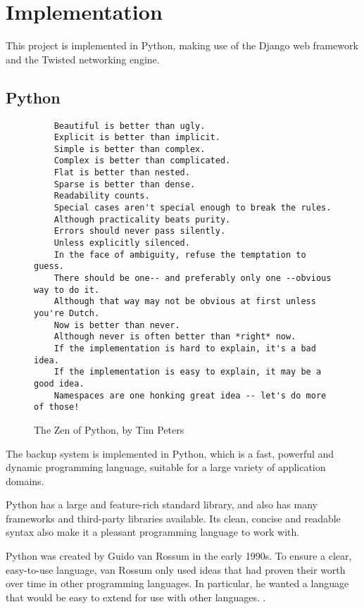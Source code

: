 \chapter{Implementation}

This project is implemented in Python, making use of the Django web framework
and the Twisted networking engine.

\section{Python}

\begin{figure}[h]
    \begin{verbatim}
    Beautiful is better than ugly.
    Explicit is better than implicit.
    Simple is better than complex.
    Complex is better than complicated.
    Flat is better than nested.
    Sparse is better than dense.
    Readability counts.
    Special cases aren't special enough to break the rules.
    Although practicality beats purity.
    Errors should never pass silently.
    Unless explicitly silenced.
    In the face of ambiguity, refuse the temptation to guess.
    There should be one-- and preferably only one --obvious way to do it.
    Although that way may not be obvious at first unless you're Dutch.
    Now is better than never.
    Although never is often better than *right* now.
    If the implementation is hard to explain, it's a bad idea.
    If the implementation is easy to explain, it may be a good idea.
    Namespaces are one honking great idea -- let's do more of those!
    \end{verbatim}
    \caption{The Zen of Python, by Tim Peters}
    \label{fig:zen-of-python}
\end{figure}

The backup system is implemented in Python, which is a fast, powerful and
dynamic programming language, suitable for a large variety of application
domains.

Python has a large and feature-rich standard library, and also has many
frameworks and third-party libraries available. Its clean, concise and readable
syntax also make it a pleasant programming language to work with.

Python was created by Guido van Rossum in the early 1990s. To ensure a clear,
easy-to-use language, van Rossum only used ideas that had proven their worth
over time in other programming languages. In particular, he wanted a language
that would be easy to extend for use with other languages.
\cite{lindstrom2005}.

